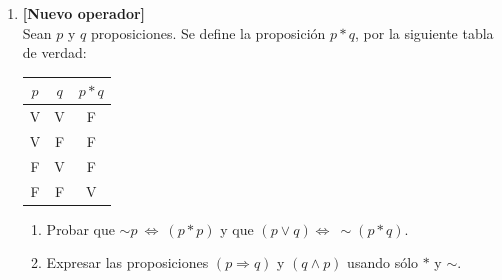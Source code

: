 \documentclass[letterpaper,11pt]{article}
\theoremstyle{plain}
\begin{document}
\begin{enumerate}[\bf P1.]
    \item \textbf{[Nuevo operador]}\\
    Sean $p$ y $q$ proposiciones. Se define la proposición
    $p *q$, por la siguiente
    tabla de verdad:
        \begin{center}
            \begin{tabular}{|c|c|c|}
                \hline $p$ & $q$ & $p  *q$\\
                \hline V & V & F\\
                \hline V & F & F\\
                \hline F & V & F\\
                \hline F & F & V\\
                \hline
            \end{tabular}
        \end{center}
        \begin{enumerate}
            \item Probar que $\sim p \ \Leftrightarrow \ (p * p)$ y que $(p \lor q) \Leftrightarrow \ \sim(p * q)$.
            \item Expresar las proposiciones $(p\Rightarrow q)$ y $(q \land p)$ usando sólo $*$ y $\sim$.
        \end{enumerate}


\end{enumerate}
\end{document}
